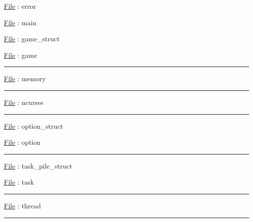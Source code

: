 \documentclass[8pt,a4paper]{article}
\begin{document}
\underline{File} : error


\underline{File} : main


\underline{File} : game\_struct

\underline{File} : game

\vspace{-0.35cm}\noindent\rule{8cm}{0.4pt}


\underline{File} : memory

\vspace{-0.35cm}\noindent\rule{8cm}{0.4pt}


\underline{File} : ncurses

\vspace{-0.35cm}\noindent\rule{8cm}{0.4pt}


\underline{File} : option\_struct


\underline{File} : option

\vspace{-0.35cm}\noindent\rule{8cm}{0.4pt}


\underline{File} : task\_pile\_struct

\underline{File} : task

\vspace{-0.35cm}\noindent\rule{8cm}{0.4pt}


\underline{File} : thread


\vspace{-0.35cm}\noindent\rule{8cm}{0.4pt}

\end{document}

